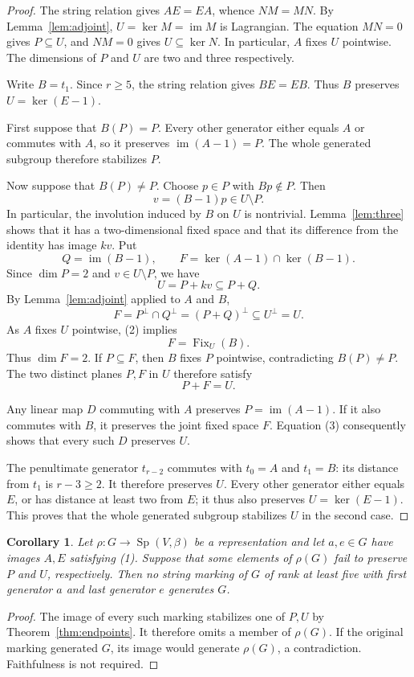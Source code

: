 \documentclass[11pt]{article}
\newtheorem{corollary}[theorem]{Corollary}
\newcommand{\im}{\operatorname{im}}
\newcommand{\Fix}{\operatorname{Fix}}
\newcommand{\Sp}{\operatorname{Sp}}
\begin{document}
\begin{proof}
The string relation gives \(AE=EA\), whence \(NM=MN\).
By Lemma~\ref{lem:adjoint}, \(U=\ker M=\im M\) is Lagrangian.
The equation \(MN=0\) gives \(P\subseteq U\), and \(NM=0\) gives
\(U\subseteq\ker N\). In particular, \(A\) fixes \(U\) pointwise.
The dimensions of \(P\) and \(U\) are two and three respectively.

Write \(B=t_1\). Since \(r\geq5\), the string relation gives
\(BE=EB\). Thus \(B\) preserves \(U=\ker(E-1)\).

First suppose that \(B(P)=P\). Every other generator either equals
\(A\) or commutes with \(A\), so it preserves \(\im(A-1)=P\).
The whole generated subgroup therefore stabilizes \(P\).

Now suppose that \(B(P)\ne P\). Choose \(p\in P\) with \(Bp\notin P\).
Then
\[
        v=(B-1)p\in U\setminus P.
\]
In particular, the involution induced by \(B\) on \(U\) is nontrivial.
Lemma~\ref{lem:three} shows that it has a two-dimensional fixed space
and that its difference from the identity has image \(kv\).
Put
\[
       Q=\im(B-1),\qquad
       F=\ker(A-1)\cap\ker(B-1).
\]
Since \(\dim P=2\) and \(v\in U\setminus P\), we have
\[
                   U=P+kv\subseteq P+Q.
\]
By Lemma~\ref{lem:adjoint} applied to \(A\) and \(B\),
\[
 F=P^\perp\cap Q^\perp=(P+Q)^\perp
       \subseteq U^\perp=U.                         \tag{2}
\]
As \(A\) fixes \(U\) pointwise, (2) implies
\[
                       F=\Fix_U(B).
\]
Thus \(\dim F=2\). If \(P\subseteq F\), then \(B\) fixes \(P\)
pointwise, contradicting \(B(P)\ne P\). The two distinct planes
\(P,F\) in \(U\) therefore satisfy
\[
                            P+F=U.                 \tag{3}
\]

Any linear map \(D\) commuting with \(A\) preserves \(P=\im(A-1)\).
If it also commutes with \(B\), it preserves the joint fixed space
\(F\). Equation (3) consequently shows that every such \(D\)
preserves \(U\).

The penultimate generator \(t_{r-2}\) commutes with \(t_0=A\) and
\(t_1=B\): its distance from \(t_1\) is \(r-3\geq2\).
It therefore preserves \(U\). Every other generator either equals
\(E\), or has distance at least two from \(E\); it thus also
preserves \(U=\ker(E-1)\).
This proves that the whole generated subgroup stabilizes \(U\) in
the second case.
\end{proof}

\begin{corollary}\label{cor:proper}
Let \(\rho:G\to\Sp(V,\beta)\) be a representation and let
\(a,e\in G\) have images \(A,E\) satisfying (1).
Suppose that some elements of \(\rho(G)\) fail to preserve \(P\)
and \(U\), respectively. Then no string marking of \(G\) of rank
at least five with first generator \(a\) and last generator \(e\)
generates \(G\).
\end{corollary}
\begin{proof}
The image of every such marking stabilizes one of \(P,U\) by
Theorem~\ref{thm:endpoints}. It therefore omits a member of
\(\rho(G)\). If the original marking generated \(G\), its image
would generate \(\rho(G)\), a contradiction.
Faithfulness is not required.
\end{proof}
\end{document}
